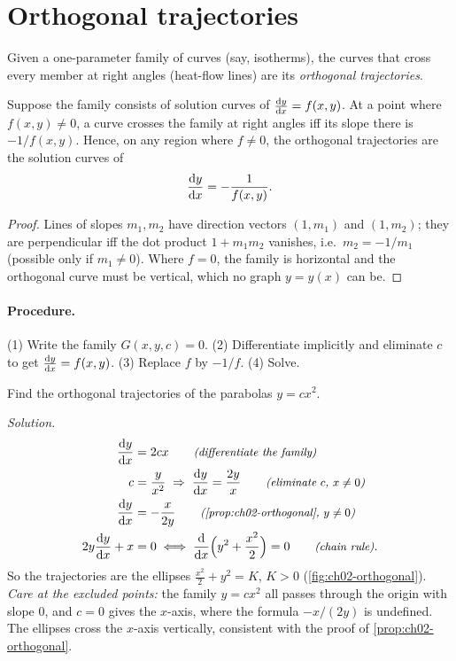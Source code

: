\section{Orthogonal trajectories}\label{sec:ch02-orthogonal}

Given a one-parameter family of curves (say, isotherms), the curves that cross
every member at right angles (heat-flow lines) are its \emph{orthogonal
trajectories}.

\begin{proposition}\label{prop:ch02-orthogonal}
Suppose the family consists of solution curves of $\frac{\mathrm{d}y}{\mathrm{d}x} = f(x,y)$. At a
point where $f(x,y)\neq 0$, a curve crosses the family at right angles iff its
slope there is $-1/f(x,y)$. Hence, on any region where $f\neq0$, the
orthogonal trajectories are the solution curves of
\[
  \frac{\mathrm{d}y}{\mathrm{d}x} = -\frac{1}{f(x,y)}.
\]
\end{proposition}
\begin{proof}
Lines of slopes $m_1, m_2$ have direction vectors $(1,m_1)$ and $(1,m_2)$;
they are perpendicular iff the dot product $1 + m_1m_2$ vanishes, i.e.\
$m_2 = -1/m_1$ (possible only if $m_1\neq 0$). Where $f = 0$, the family is
horizontal and the orthogonal curve must be vertical, which no graph
$y = y(x)$ can be.
\end{proof}

\paragraph{Procedure.} (1) Write the family $G(x,y,c) = 0$. (2) Differentiate
implicitly and eliminate $c$ to get $\frac{\mathrm{d}y}{\mathrm{d}x} = f(x,y)$. (3) Replace $f$ by
$-1/f$. (4) Solve.

\begin{example}\label{ex:ch02-orth-parabola}
Find the orthogonal trajectories of the parabolas $y = cx^2$.

\emph{Solution.}
\begin{align*}
  \der{y}{x} &= 2cx \why{differentiate the family}\\
  c &= \frac{y}{x^2} \;\Rightarrow\; \der{y}{x} = \frac{2y}{x}
     \why{eliminate $c$, $x\neq0$}\\
  \der{y}{x} &= -\frac{x}{2y} \why{\cref{prop:ch02-orthogonal}, $y\neq 0$}\\
  2y\der{y}{x} + x &= 0
     \;\Longleftrightarrow\; \der{}{x}\Bigl(y^2 + \frac{x^2}{2}\Bigr) = 0
     \why{chain rule}.
\end{align*}
So the trajectories are the ellipses $\frac{x^2}{2} + y^2 = K$, $K>0$
(\cref{fig:ch02-orthogonal}). \emph{Care at the excluded points:} the family
$y = cx^2$ all passes through the origin with slope $0$, and $c = 0$ gives the
$x$-axis, where the formula $-x/(2y)$ is undefined. The ellipses cross the
$x$-axis vertically, consistent with the proof of
\cref{prop:ch02-orthogonal}.
\end{example}

